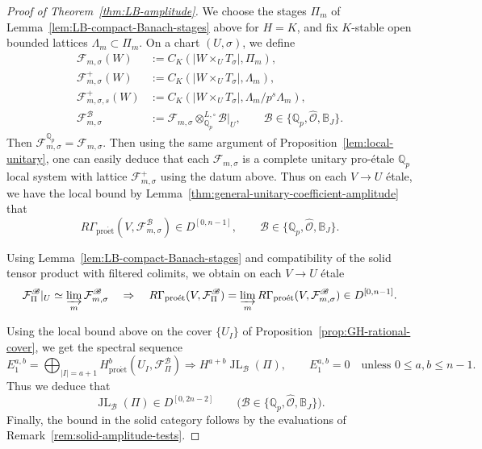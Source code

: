 \documentclass[11pt]{article}
\theoremstyle{definition}
\newcommand{\Qp}{\mathbb Q_p}
\newcommand{\cF}{\mathcal F}
\newcommand{\proet}{\mathrm{pro\acute et}}
\newcommand{\JL}{\operatorname{JL}}
\begin{document}
\begin{proof}[Proof of Theorem~\ref{thm:LB-amplitude}]
We choose the stages \(\Pi_m\) of
Lemma~\ref{lem:LB-compact-Banach-stages} above for \(H=K\), and fix
\(K\)-stable open bounded lattices \(\Lambda_m\subset \Pi_m\).
On a chart \((U,\sigma)\), we define
\begin{align*}
 \cF_{m,\sigma}(W)
 &:=C_K(|W\times_UT_\sigma|,\Pi_m),\\
 \cF^+_{m,\sigma}(W)
 &:=C_K(|W\times_UT_\sigma|,\Lambda_m),\\
 \cF^+_{m,\sigma,s}(W)
 &:=C_K(|W\times_UT_\sigma|,\Lambda_m/p^s\Lambda_m),\\
 \cF_{m,\sigma}^{\mathscr B}
 &:=\cF_{m,\sigma}\otimes_{\Qp}^{L,\square}\mathscr B|_U,
 \qquad\mathscr B\in\{\Qp,\widehat{\mathscr O},\mathbb B_J\}.
\end{align*}
Then \(\cF_{m,\sigma}^{\Qp}=\cF_{m,\sigma}\). 
Then using the same argument of Proposition~\ref{lem:local-unitary}, 
one can easily deduce that each $\cF_{m, \sigma}$ is a complete unitary pro-\'etale $\mathbb{Q}_p$ local system 
with lattice $\cF_{m,\sigma}^+$ using the datum above. 
Thus on each $V\to U$ \'etale, we have the local bound by Lemma~\ref{thm:general-unitary-coefficient-amplitude} that
\[R\Gamma_{\proet}(V, \cF^{\mathscr{B}}_{m, \sigma})\in D^{[0,n-1]},\qquad \mathscr{B}\in\{\mathbb{Q}_p,\widehat{\mathscr{O}}, \mathbb{B}_J\}.\]

Using Lemma~\ref{lem:LB-compact-Banach-stages} and compatibility
of the solid tensor product with filtered colimits, we obtain on each $V\to U$ \'etale
\begin{equation}\label{eq:LB-all-coefficient-continuity}
 \cF_\Pi^{\mathscr B}|_U
 \simeq\varinjlim_m\cF_{m,\sigma}^{\mathscr B}\quad \Rightarrow\quad R\Gamma_{\proet}(V,\cF_{\Pi}^{\mathscr{B}})=\varinjlim_m R\Gamma_{\proet}(V,\cF_{m, \sigma}^{\mathscr{B}})\in D^{[0,n-1]}.
\end{equation}

Using the local bound above on the cover $\{U_I\}$ of
Proposition~\ref{prop:GH-rational-cover}, we get the spectral sequence
\[
 E_1^{a,b}=\bigoplus_{|I|=a+1}
 H^b_{\proet}(U_I,\cF_\Pi^{\mathscr B})
 \Longrightarrow H^{a+b}\JL_{\mathscr B}(\Pi),\qquad
 E_1^{a,b}=0\quad\text{unless }0\leq a,b\leq n-1.
\]
Thus we deduce that
\[
 \JL_{\mathscr B}(\Pi)\in D^{[0,2n-2]}
 \qquad
 \bigl(\mathscr B\in\{\Qp,\widehat{\mathscr O},\mathbb B_J\}\bigr).
\]
Finally, the bound in the solid category follows by the evaluations of
Remark~\ref{rem:solid-amplitude-tests}.
\end{proof}
\end{document}
